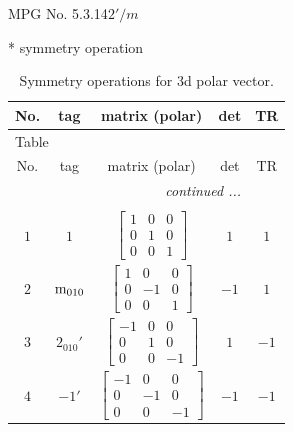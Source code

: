 \documentclass[fleqn,8pt]{jsarticle}
\begin{document}
\setcounter{MaxMatrixCols}{32}

\renewcommand{\tablename}{Table~}
\renewcommand{\figurename}{Figure~}
\begin{center}
\LARGE
MPG No. 5.3.14\quad$2'/m$
\end{center}
* symmetry operation
\renewcommand{\arraystretch}{1.3}
\begin{longtable}{ccccc}
\caption{Symmetry operations for 3d polar vector.}
 \\
 \hline \hline
No. & tag & matrix (polar) & det & TR \\ \hline \endfirsthead

\multicolumn{4}{l}{\tablename\ \thetable{}} \\
 \hline \hline
No. & tag & matrix (polar) & det & TR \\ \hline \endhead

 \hline \hline
\multicolumn{4}{r}{\footnotesize\it continued ...} \\ \endfoot

 \hline \hline
\multicolumn{4}{r}{} \\ \endlastfoot

$ 1 $ & $ 1 $ & $ \begin{bmatrix} 1 & 0 & 0 \\ 0 & 1 & 0 \\ 0 & 0 & 1 \end{bmatrix} $ & $ 1 $ & $ 1 $ \\ \hline
$ 2 $ & $ {\rm m}_{010} $ & $ \begin{bmatrix} 1 & 0 & 0 \\ 0 & -1 & 0 \\ 0 & 0 & 1 \end{bmatrix} $ & $ -1 $ & $ 1 $ \\ \hline
$ 3 $ & $ 2{}_{010}{}' $ & $ \begin{bmatrix} -1 & 0 & 0 \\ 0 & 1 & 0 \\ 0 & 0 & -1 \end{bmatrix} $ & $ 1 $ & $ -1 $ \\ \hline
$ 4 $ & $ -1{}' $ & $ \begin{bmatrix} -1 & 0 & 0 \\ 0 & -1 & 0 \\ 0 & 0 & -1 \end{bmatrix} $ & $ -1 $ & $ -1 $ \\
\end{longtable}
\end{document}
